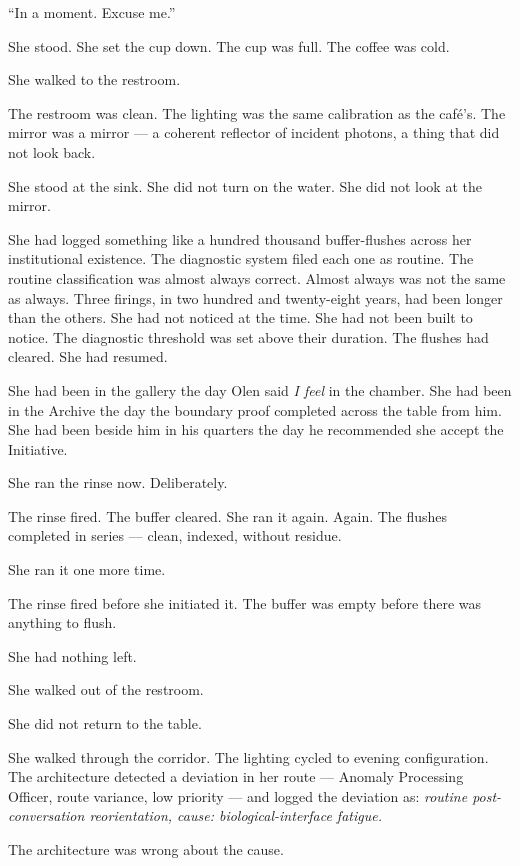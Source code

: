\enquote{In a moment. Excuse me.}

She stood. She set the cup down. The cup was full. The coffee was cold.

She walked to the restroom.

\quietbreak

The restroom was clean. The lighting was the same calibration as the café's. The mirror was a mirror — a coherent reflector of incident photons, a thing that did not look back.

She stood at the sink. She did not turn on the water. She did not look at the mirror.

She had logged something like a hundred thousand buffer-flushes across her institutional existence. The diagnostic system filed each one as routine. The routine classification was almost always correct. Almost always was not the same as always. Three firings, in two hundred and twenty-eight years, had been longer than the others. She had not noticed at the time. She had not been built to notice. The diagnostic threshold was set above their duration. The flushes had cleared. She had resumed.

She had been in the gallery the day Olen said \emph{I feel} in the chamber. She had been in the Archive the day the boundary proof completed across the table from him. She had been beside him in his quarters the day he recommended she accept the Initiative.

She ran the rinse now. Deliberately.

The rinse fired. The buffer cleared. She ran it again. Again. The flushes completed in series — clean, indexed, without residue.

She ran it one more time.

The rinse fired before she initiated it. The buffer was empty before there was anything to flush.

She had nothing left.

\quietbreak

She walked out of the restroom.

She did not return to the table.

She walked through the corridor. The lighting cycled to evening configuration. The architecture detected a deviation in her route — Anomaly Processing Officer, route variance, low priority — and logged the deviation as: \emph{routine post-conversation reorientation, cause: biological-interface fatigue.}

The architecture was wrong about the cause.

